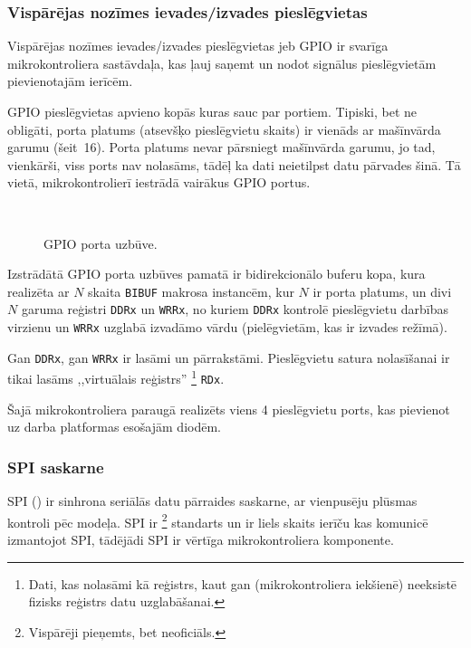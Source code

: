 	\subsubsection{Vispārējas nozīmes ievades/izvades pieslēgvietas}
		Vispārējas nozīmes ievades/izvades pieslēgvietas jeb GPIO ir svarīga
		mikrokontroliera sastāvdaļa, kas ļauj saņemt un nodot signālus
		pieslēgvietām pievienotajām ierīcēm.
		
		GPIO pieslēgvietas apvieno kopās kuras sauc par portiem. Tipiski, bet
		ne obligāti, porta platums (atsevšķo pieslēgvietu skaits) ir vienāds
		ar mašīnvārda garumu (šeit~16). Porta platums nevar pārsniegt
		mašīnvārda garumu, jo tad, vienkārši, viss ports nav nolasāms, tādēļ ka dati
		neietilpst datu pārvades šinā. Tā vietā, mikrokontrolierī iestrādā
		vairākus GPIO portus.
		
		\begin{figure}[th]
			\centering
			\def\svgwidth{0.9\textwidth}
			{\ttfamily\footnotesize}\\
			\caption{GPIO porta uzbūve.}
			\label{fig:gpio}
		\end{figure}
		
		Izstrādātā GPIO porta uzbūves pamatā ir
		bidirekcionālo buferu kopa, kura realizēta ar $N$ skaita
		\texttt{BIBUF} makrosa instancēm, kur $N$ ir porta platums,
		un divi $N$ garuma reģistri \texttt{DDRx} un \texttt{WRRx},
		no kuriem \texttt{DDRx} kontrolē pieslēgvietu darbības virzienu un
		\texttt{WRRx} uzglabā izvadāmo vārdu (pielēgvietām, kas ir izvades režīmā).
		
		Gan \texttt{DDRx}, gan \texttt{WRRx} ir lasāmi un pārrakstāmi.
		Pieslēgvietu satura nolasīšanai ir tikai lasāms ,,virtuālais reģistrs''%
		\footnote{Dati, kas nolasāmi kā reģistrs, kaut gan (mikrokontroliera iekšienē)
			neeksistē fizisks reģistrs datu uzglabāšanai.}
		\texttt{RDx}.
	
	Šajā mikrokontroliera paraugā realizēts viens 4 pieslēgvietu ports, kas
	pievienot uz darba platformas esošajām diodēm.
	
	\clearpage %
	\subsubsection{SPI saskarne} \label{sec:spi}
		SPI () ir sinhrona seriālās
		datu pārraides saskarne, ar vienpusēju plūsmas kontroli pēc
		 modeļa.
		SPI ir %
		\footnote{Vispārēji pieņemts, bet neoficiāls.}
		standarts un ir liels skaits ierīču kas komunicē izmantojot SPI,
		tādējādi SPI ir vērtīga mikrokontroliera komponente.
		
